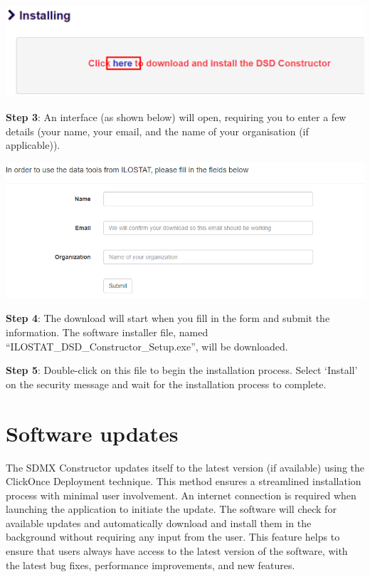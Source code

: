 \documentclass[
]{book}
\theoremstyle{definition}
\theoremstyle{definition}
\theoremstyle{definition}
\theoremstyle{definition}
\theoremstyle{remark}
\begin{document}
\begin{center}\includegraphics[width=1\linewidth]{./images/image005} \end{center}

\textbf{Step 3}: An interface (as shown below) will open, requiring you to enter a few details (your name, your email, and the name of your organisation (if applicable)).

\begin{center}\includegraphics[width=1\linewidth]{./images/image007} \end{center}

\textbf{Step 4}: The download will start when you fill in the form and submit the information. The software installer file, named ``ILOSTAT\_DSD\_Constructor\_Setup.exe'', will be downloaded.

\textbf{Step 5}: Double-click on this file to begin the installation process. Select `Install' on the security message and wait for the installation process to complete.

\hypertarget{software-updates}{%
\section{Software updates}\label{software-updates}}

The SDMX Constructor updates itself to the latest version (if available) using the ClickOnce Deployment technique. This method ensures a streamlined installation process with minimal user involvement. An internet connection is required when launching the application to initiate the update. The software will check for available updates and automatically download and install them in the background without requiring any input from the user. This feature helps to ensure that users always have access to the latest version of the software, with the latest bug fixes, performance improvements, and new features.
\end{document}
